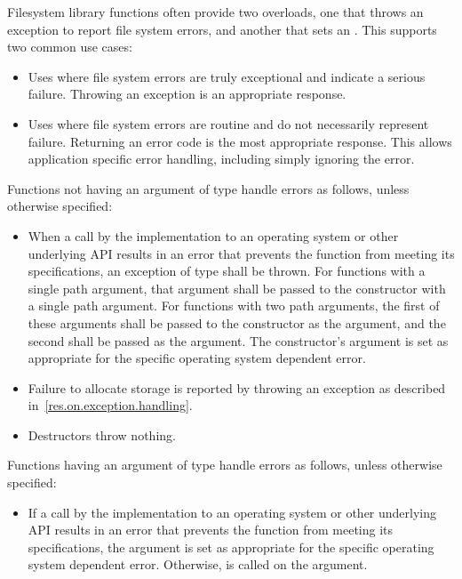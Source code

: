 \pnum
Filesystem library functions often provide two overloads, one that
throws an exception to report file system errors, and another that sets an .
\enternote This supports two common use cases:
\begin{itemize}
\item
Uses where file system errors are truly exceptional
and indicate a serious failure.
Throwing an exception is an appropriate response.
\item
Uses where file system errors are routine
and do not necessarily represent failure.
Returning an error code is the most appropriate response.
This allows application specific error handling, including simply ignoring the error.
\end{itemize}
\exitnote

\pnum
Functions not having an argument of type 
handle errors as follows, unless otherwise specified:
\begin{itemize}
\item When a call by the
  implementation to an operating system or other underlying API results in an
  error that prevents the function from meeting its specifications, an exception
  of type
 shall be thrown. For functions with a single path
  argument, that argument shall be passed to the
 constructor with a single path argument. For
  functions with two path arguments, the first of these arguments shall be
  passed to the
 constructor as the  argument,
  and the second shall be passed as the  argument. The
   constructor's  argument
  is set as appropriate for the specific operating system dependent error.
\item Failure to allocate storage is reported by throwing an exception
as described in~\ref{res.on.exception.handling}.
\item Destructors throw nothing.
\end{itemize}

\pnum
Functions having an argument of type 
handle errors as follows, unless otherwise specified:
\begin{itemize}
\item If a call by the
  implementation to an operating system or other underlying API results in an
  error that prevents the function from meeting its specifications, the
   argument is set as
  appropriate for the specific operating system dependent error. Otherwise, 
  is called on the
   argument.
\end{itemize}

